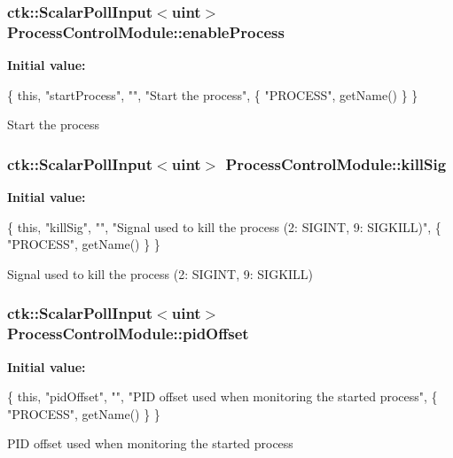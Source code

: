 \subsubsection[{\texorpdfstring{enable\+Process}{enableProcess}}]{\setlength{\rightskip}{0pt plus 5cm}ctk\+::\+Scalar\+Poll\+Input$<$uint$>$ Process\+Control\+Module\+::enable\+Process}\hypertarget{structProcessControlModule_a0e5511753b568a4fde7d00caa1575299}{}\label{structProcessControlModule_a0e5511753b568a4fde7d00caa1575299}
{\bfseries Initial value\+:}
\begin{DoxyCode}
\{ \textcolor{keyword}{this}, \textcolor{stringliteral}{"startProcess"}, \textcolor{stringliteral}{""}, \textcolor{stringliteral}{"Start the process"},
    \{ \textcolor{stringliteral}{"PROCESS"}, getName() \} \}
\end{DoxyCode}
Start the process 
\subsubsection[{\texorpdfstring{kill\+Sig}{killSig}}]{\setlength{\rightskip}{0pt plus 5cm}ctk\+::\+Scalar\+Poll\+Input$<$uint$>$ Process\+Control\+Module\+::kill\+Sig}\hypertarget{structProcessControlModule_a47ea8ec5bf7aa3914bb61f12c6aefe59}{}\label{structProcessControlModule_a47ea8ec5bf7aa3914bb61f12c6aefe59}
{\bfseries Initial value\+:}
\begin{DoxyCode}
\{ \textcolor{keyword}{this}, \textcolor{stringliteral}{"killSig"}, \textcolor{stringliteral}{""}, \textcolor{stringliteral}{"Signal used to kill the process (2: SIGINT, 9: SIGKILL)"},
    \{ \textcolor{stringliteral}{"PROCESS"}, getName() \} \}
\end{DoxyCode}
Signal used to kill the process (2\+: S\+I\+G\+I\+NT, 9\+: S\+I\+G\+K\+I\+LL) 
\subsubsection[{\texorpdfstring{pid\+Offset}{pidOffset}}]{\setlength{\rightskip}{0pt plus 5cm}ctk\+::\+Scalar\+Poll\+Input$<$uint$>$ Process\+Control\+Module\+::pid\+Offset}\hypertarget{structProcessControlModule_a9a3ef4d12ac2b4794154ed091b655796}{}\label{structProcessControlModule_a9a3ef4d12ac2b4794154ed091b655796}
{\bfseries Initial value\+:}
\begin{DoxyCode}
\{ \textcolor{keyword}{this}, \textcolor{stringliteral}{"pidOffset"}, \textcolor{stringliteral}{""}, \textcolor{stringliteral}{"PID offset used when monitoring the started process"},
    \{ \textcolor{stringliteral}{"PROCESS"}, getName() \} \}
\end{DoxyCode}
P\+ID offset used when monitoring the started process 
